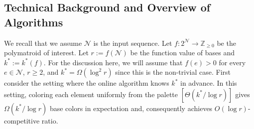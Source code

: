 \documentclass[11pt]{article}
\theoremstyle{definition}
\newcommand{\calN}{{\mathcal{N}}}
\newcommand{\Z}{\mathbb{Z}}
\newcommand{\DSC}{\textsc{Disj-Set-Cover}\xspace}
\newcommand{\opt}{\texttt{opt}}
\begin{document}
 \subsection{Technical Background and Overview of Algorithms}
\iffalse
Let us first consider \DSC, where the polymatroid $f$ is defined to be the coverage function of the input hypergraph $H=(V,E)$. We let $n:=|V|$ be the number of vertices and $m:=|E|$ be the number of hyperedges. As we have mentioned before, the quantity $k^*$ equals the min-degree $\delta_H$ of $H$. If the min-degree $\delta_H$ is known in advance, Pananjady, Bagaria, and Vaze \cite{PBV15} showed that sampling the color of each hypergraph uniformly from the palette $[\Theta(\delta_H/\log n)]$ would lead to $\Omega(\delta_H/\log n)$ base colors. Emek, Goldbraikh, and Kantor \cite{EGK19} presented a randomized online algorithm without prior knowledge of $\delta_H$. Their algorithm works as follows: When hyperedge $e_t$ arrives, the algorithm first computes the min-degree $\delta_t$ of a vertex in $e_t$ in the hypergraph containing all hyperedges that have arrives so far. By a combinatorial lemma, they showed that $\delta_t\leq \delta_H\leq \delta_t\cdot O(n)$ for a constant fraction of timesteps $t\in [m]$. Their algorithm then 
samples 
$P_t$ uniformly from $\{\delta_t\cdot 2^0, \delta_t\cdot 2^1, \delta_t\cdot 2^2, \ldots, \delta_t\cdot 2^{O(\log n)}\}$. We note that if $\delta_t\le \delta_H\le \delta_t\cdot O(n)$, then $P_t$ is a $2$-approximation of $\delta_H$ with probability $\Omega(\frac{1}{\log n})$. Finally, the algorithm samples the color $C(e_t)$ of the hyperedge $e_t$ uniformly from the palette $[\Theta(P_t/\log^2 n)]$. Since expected $\Omega(1/\log n)$ fraction of timesteps obtain a $2$-approximation of $\delta_H$, the algorithm achieves $\Omega(\delta_H/\log ^2n)$ base colors in expectation. We note that $\opt(f)\le k^* = \delta_H$ and hence the competitive ratio is $O(\log^2 n)$. 
\fi

We recall that we assume $\mathcal{N}$ is the input sequence. Let $f:2^\mathcal{N} \rightarrow \Z_{\ge 0}$ be the polymatroid of interest. Let  $r:=f(\mathcal{N})$ be the function value of bases and $k^*:=k^*(f)$. For the discussion here, we will assume that $f(e)>0$ for every $e\in \calN$, $r\geq 2$, and $k^*=\Omega(\log^2 r)$ since this is the non-trivial case. 
First consider the setting where the online algorithm knows $k^*$ in advance. In this setting, coloring each element uniformly from the palette $[\Theta(k^*/\log r)]$ gives $\Omega(k^*/\log{r})$ base colors in expectation and, consequently achieves $O(\log{r})$-competitive ratio. 
\end{document}
